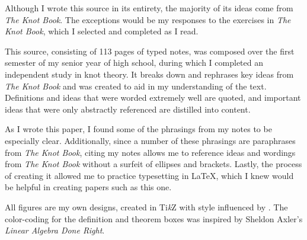 \documentclass[titlepage,11pt]{article}
\newenvironment{bibcomment}{
    \item[]
    \begingroup
    \par
    \parshape0
}{
    \par
    \endgroup
}
\begin{document}
\begin{thebibliography}{1}
    \begin{bibcomment}
        \setlength{\leftskip}{1cm}
        Although I wrote this source in its entirety, the majority of its ideas come from \emph{The Knot Book}. The exceptions would be my responses to the exercises in \emph{The Knot Book}, which I selected and completed as I read.\par
        \hspace{1em}This source, consisting of 113 pages of typed notes, was composed over the first semester of my senior year of high school, during which I completed an independent study in knot theory. It breaks down and rephrases key ideas from \emph{The Knot Book} and was created to aid in my understanding of the text. Definitions and ideas that were worded extremely well are quoted, and important ideas that were only abstractly referenced are distilled into content.\par
        \hspace{1em}As I wrote this paper, I found some of the phrasings from my notes to be especially clear. Additionally, since a number of these phrasings are paraphrases from \emph{The Knot Book}, citing my notes allows me to reference ideas and wordings from \emph{The Knot Book} without a surfeit of ellipses and brackets. Lastly, the process of creating it allowed me to practice typesetting in LaTeX, which I knew would be helpful in creating papers such as this one.
    \end{bibcomment}
\end{thebibliography}

\noindent All figures are my own designs, created in Ti\emph{k}Z with style influenced by \cite{bib:knotbook}. The color-coding for the definition and theorem boxes was inspired by Sheldon Axler's \emph{Linear Algebra Done Right}.
\end{document}
